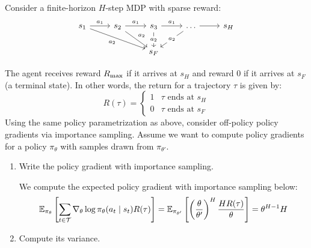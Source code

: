 \documentclass{article}
\begin{document}
\begin{enumerate}
\begin{enumerate}
\begin{sol}
    \end{sol}

\end{enumerate}

\newpage

 Consider a finite-horizon $H$-step MDP with sparse reward:
\[\begin{tikzcd}
	{s_1} & {s_2} & {s_3} & \dots & {s_H} \\
	&& {s_F}
	\arrow["{a_1}", from=1-1, to=1-2]
	\arrow["{a_1}", from=1-2, to=1-3]
	\arrow["{a_2}"', from=1-1, to=2-3]
	\arrow["{a_1}", from=1-3, to=1-4]
	\arrow[from=1-4, to=1-5]
	\arrow["{a_2}", from=1-2, to=2-3]
	\arrow["{a_2}"{description}, from=1-3, to=2-3]
	\arrow["{a_2}"{description}, from=1-4, to=2-3]
\end{tikzcd}\]

The agent receives reward $R_{\textrm{max}}$ if it arrives at $s_H$ and reward $0$ if it arrives at $s_F$ (a terminal state). In other words, the return for a trajectory $\tau$ is given by:
\[R(\tau) = \begin{cases}1 & \tau \textrm{ ends at } s_H \\ 0 & \tau \textrm{ ends at } s_F \end{cases}\]
Using the same policy parametrization as above, consider off-policy policy gradients via importance sampling. Assume we want to compute policy gradients for a policy $\pi_\theta$ with samples drawn from $\pi_{\theta'}$.
\begin{enumerate}
    \item Write the policy gradient with importance sampling.

    \begin{sol}
        We compute the expected policy gradient with importance sampling below:
        \[\mathbb{E}_{\pi_\theta}\left[\sum_{t \in \mathcal{T}} \nabla_\theta \log \pi_\theta(a_t \mid s_t) R(\tau)\right] = \mathbb{E}_{\pi_{\theta'}}\left[\left(\frac{\theta}{\theta'}\right)^{H} \frac{HR(\tau)}{\theta}\right] = \theta^{H - 1}H\]
    \end{sol}

    \newpage
    \item Compute its variance.
    

\end{enumerate}
\end{enumerate}
\end{document}
